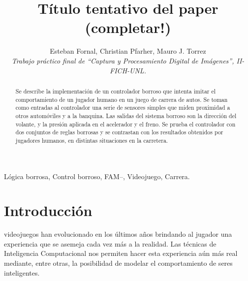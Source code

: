\documentclass[conference,spanish,a4paper,10pt,oneside,final]{tfmpd}
\begin{document}
\title{Título tentativo del paper (completar!)}
\author{Esteban Fornal, Christian Pfarher, Mauro J. Torrez\\
\textit{Trabajo práctico final de ``Captura y Procesamiento Digital de
Imágenes'', II-FICH-UNL.}}
\maketitle
%
%
%
%
\begin{abstract}
Se describe la implementación de un controlador borroso %
que intenta imitar el comportamiento de un jugador humano en un juego de carrera
de autos. Se toman como entradas al controlador una serie de sensores simples
que miden proximidad a otros automóviles y a la banquina. Las salidas del sistema
borroso son la dirección del volante, y la presión aplicada en el acelerador y el
freno.
Se prueba el controlador con dos conjuntos de reglas borrosas y se contrastan con
los resultados obtenidos por jugadores humanos, en distintas situaciones en la
carretera.
\end{abstract}
%
%
%
%
\begin{keywords}
Lógica borrosa, Control borroso, FAM--, Videojuego, Carrera.
\end{keywords}
%
%
%
%
\section{Introducción}
 videojuegos han evolucionado en los últimos años brindando al jugador una experiencia
que se asemeja cada vez más a la realidad. Las técnicas de Inteligencia Computacional nos permiten
hacer esta experiencia aún más real mediante, entre otras, la posibilidad de modelar el comportamiento
de seres inteligentes.

\end{document}
